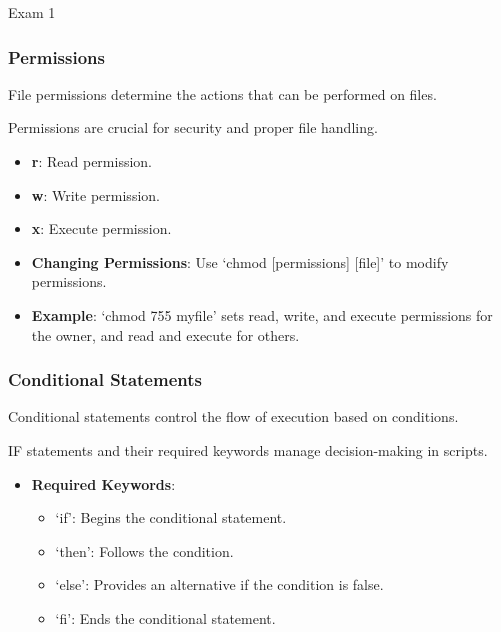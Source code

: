\begin{examnotes}{Exam 1}
    \subsubsection*{Permissions}

    File permissions determine the actions that can be performed on files.

    \begin{highlight}[Permissions]
        Permissions are crucial for security and proper file handling.
        
        \begin{itemize}
            \item \textbf{r}: Read permission.
            \item \textbf{w}: Write permission.
            \item \textbf{x}: Execute permission.
            \item \textbf{Changing Permissions}: Use `chmod [permissions] [file]' to modify permissions.
            \item \textbf{Example}: `chmod 755 myfile' sets read, write, and execute permissions for the owner, and read and execute for others.
        \end{itemize}
    \end{highlight}

    \subsubsection*{Conditional Statements}

    Conditional statements control the flow of execution based on conditions.

    \begin{highlight}
        IF statements and their required keywords manage decision-making in scripts.
        
        \begin{itemize}
            \item \textbf{Required Keywords}: 
                \begin{itemize}
                    \item `if': Begins the conditional statement.
                    \item `then': Follows the condition.
                    \item `else': Provides an alternative if the condition is false.
                    \item `fi': Ends the conditional statement.
                \end{itemize}
        \end{itemize}
    \end{highlight}


\end{examnotes}
